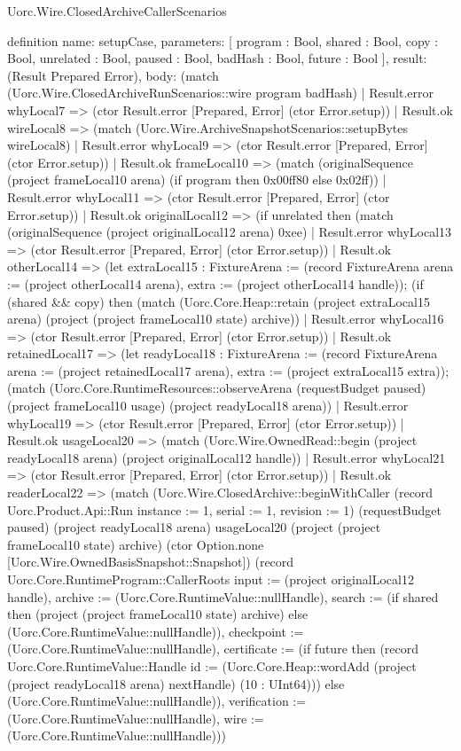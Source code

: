 \begin{lexlean}{Uorc.Wire.ClosedArchiveCallerScenarios}
\begin{semanticmodule}
definition{
  name: setupCase,
  parameters: [
    program : Bool,
    shared : Bool,
    copy : Bool,
    unrelated : Bool,
    paused : Bool,
    badHash : Bool,
    future : Bool
  ],
  result: (Result Prepared Error),
  body: (match (Uorc.Wire.ClosedArchiveRunScenarios::wire program badHash)
    | Result.error whyLocal7 => (ctor Result.error [Prepared, Error] (ctor Error.setup))
    | Result.ok wireLocal8 => (match (Uorc.Wire.ArchiveSnapshotScenarios::setupBytes wireLocal8)
      | Result.error whyLocal9 => (ctor Result.error [Prepared, Error] (ctor Error.setup))
      | Result.ok frameLocal10 => (match (originalSequence (project frameLocal10 arena) (if program then 0x00ff80 else 0x02ff))
        | Result.error whyLocal11 => (ctor Result.error [Prepared, Error] (ctor Error.setup))
        | Result.ok originalLocal12 => (if unrelated then (match (originalSequence (project originalLocal12 arena) 0xee)
          | Result.error whyLocal13 => (ctor Result.error [Prepared, Error] (ctor Error.setup))
          | Result.ok otherLocal14 => (let extraLocal15 : FixtureArena := (record FixtureArena {arena := (project otherLocal14 arena), extra := (project otherLocal14 handle)}); (if (shared && copy) then (match (Uorc.Core.Heap::retain (project extraLocal15 arena) (project (project frameLocal10 state) archive))
            | Result.error whyLocal16 => (ctor Result.error [Prepared, Error] (ctor Error.setup))
            | Result.ok retainedLocal17 => (let readyLocal18 : FixtureArena := (record FixtureArena {arena := (project retainedLocal17 arena), extra := (project extraLocal15 extra)}); (match (Uorc.Core.RuntimeResources::observeArena (requestBudget paused) (project frameLocal10 usage) (project readyLocal18 arena))
              | Result.error whyLocal19 => (ctor Result.error [Prepared, Error] (ctor Error.setup))
              | Result.ok usageLocal20 => (match (Uorc.Wire.OwnedRead::begin (project readyLocal18 arena) (project originalLocal12 handle))
                | Result.error whyLocal21 => (ctor Result.error [Prepared, Error] (ctor Error.setup))
                | Result.ok readerLocal22 => (match (Uorc.Wire.ClosedArchive::beginWithCaller (record Uorc.Product.Api::Run {instance := 1, serial := 1, revision := 1}) (requestBudget paused) (project readyLocal18 arena) usageLocal20 (project (project frameLocal10 state) archive) (ctor Option.none [Uorc.Wire.OwnedBasisSnapshot::Snapshot]) (record Uorc.Core.RuntimeProgram::CallerRoots {input := (project originalLocal12 handle), archive := (Uorc.Core.RuntimeValue::nullHandle), search := (if shared then (project (project frameLocal10 state) archive) else (Uorc.Core.RuntimeValue::nullHandle)), checkpoint := (Uorc.Core.RuntimeValue::nullHandle), certificate := (if future then (record Uorc.Core.RuntimeValue::Handle {id := (Uorc.Core.Heap::wordAdd (project (project readyLocal18 arena) nextHandle) (10 : UInt64))}) else (Uorc.Core.RuntimeValue::nullHandle)), verification := (Uorc.Core.RuntimeValue::nullHandle), wire := (Uorc.Core.RuntimeValue::nullHandle)}))
}
\end{semanticmodule}
\end{lexlean}
